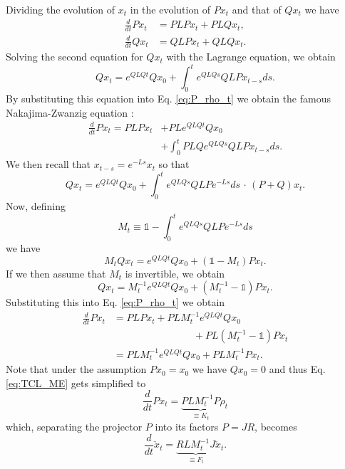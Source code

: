 \documentclass[twocolumn]{autart}    %
\newcommand{\one}{\mathbb{1}}
\begin{document}
Dividing the evolution of $x_t$ in the evolution of $P x_t$ and that of $Q x_t$ we have 
\begin{align}
    \frac{d}{dt}P x_t &= P LP x_t + PLQ x_t,\label{eq:P_rho_t}\\
    \frac{d}{dt}Q x_t &= QLP x_t + QLQ x_t.
\end{align}
Solving the second equation for $Q x_t$ with the Lagrange equation, we obtain
\[Qx_t = e^{QLQ t} Qx_0 + \int_0^t e^{QLQ s }QLP x_{t-s} ds.\]
By substituting this equation into Eq. \eqref{eq:P_rho_t} we obtain the famous Nakajima-Zwanzig equation \cite{nakajima,zwanzig}:
\begin{align}
    \frac{d}{dt}P x_t = PLP x_t &+ PL e^{QLQ t} Qx_0 \nonumber\\&+\int_0^t PLQ e^{QLQ s }QLP x_{t-s} ds.
\end{align}
We then recall that 
\(x_{t-s} = e^{-L s}x_t\)
so that 
\[Qx_t = e^{QLQ t} Qx_0 +\int_0^t e^{QLQ s }QLP e^{-L s} ds\, \cdot\, (P + Q) x_t. \]
Now, defining 
\begin{equation}
    M_t \equiv \one - \int_0^t e^{QLQ s }QLP e^{-L s} ds
    \label{eq:M_t}
\end{equation}
we have 
\[M_t Qx_t = e^{QLQ t} Qx_0 + (\one-M_t) Px_t.\]
If we then assume that $M_t$ is invertible, we obtain 
\[Qx_t = M_t^{-1}e^{QLQ t} Qx_0 + (M_t^{-1} -\one) P x_t.\]
Substituting this into Eq. \eqref{eq:P_rho_t} we obtain 
\begin{align}
    \frac{d}{dt}Px_t &= PLP x_t + PLM_t^{-1}e^{QLQ t} Qx_0 \nonumber \\& \qquad\qquad\qquad\qquad+ PL (M_t^{-1}-\one) P x_t \nonumber\\ &= PLM_t^{-1}e^{QLQ t} Qx_0 + PLM_t^{-1} Px_t.
    \label{eq:TCL_ME}
\end{align}
Note that under the assumption $Px_0=x_0$ we have $Qx_0=0$ and thus Eq. \eqref{eq:TCL_ME} gets simplified to 
\begin{equation}
  \frac{d}{dt}Px_t = \underbrace{PLM_t^{-1} P}_{\equiv K_t} \rho_t  
  \label{eq:tcl_me_no_affine}
\end{equation}
which, separating the projector $P$ into its factors $P = JR$, becomes  
\begin{equation}
    \frac{d}{dt}\check{x}_t = \underbrace{RL M_t^{-1} J}_{\equiv F_t} \check{x}_t.
    \label{eq:tcl_me_reduced}
\end{equation}
\end{document}

